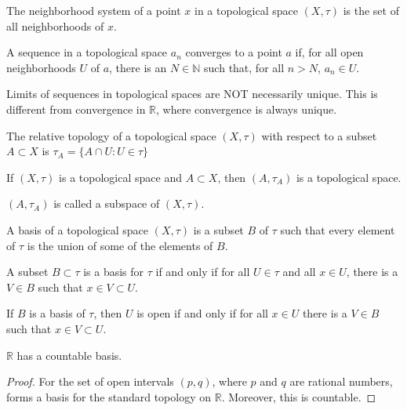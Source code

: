     \begin{definition}
        The neighborhood system of a point
        $x$ in a topological space $(X,\tau)$
        is the set of all neighborhoods of
        $x$.
    \end{definition}
    \begin{definition}
        A sequence in a topological space
        $a_{n}$ converges to a point $a$ if,
        for all open neighborhoods $U$ of $a$,
        there is an $N\in\mathbb{N}$ such that,
        for all $n>N$, $a_{n}\in{U}$.
    \end{definition}
    Limits of sequences in topological spaces are NOT
    necessarily unique. This is different from convergence
    in $\mathbb{R}$, where convergence is always unique.
    \begin{definition}
        The relative topology of a
        topological space $(X,\tau)$ with
        respect to a subset $A\subset{X}$
        is $\tau_{A}=\{A\cap{U}:U\in\tau\}$
    \end{definition}
    \begin{theorem}
        If $(X,\tau)$ is a topological space and
        $A\subset{X}$, then
        $(A,\tau_{A})$ is a topological space.
    \end{theorem}
    $(A,\tau_{A})$ is called a subspace of
    $(X,\tau)$.
    \begin{definition}
        A basis of a topological space
        $(X,\tau)$ is a subset $B$ of
        $\tau$ such that every element
        of $\tau$ is the union of some of the
        elements of $B$.
    \end{definition}
    \begin{theorem}
        A subset $B\subset\tau$ is a basis
        for $\tau$ if and only if for all
        $U\in\tau$ and all $x\in{U}$, there is
        a $V\in{B}$ such that
        $x\in{V}\subset{U}$.
    \end{theorem}
    \begin{theorem}
        If $B$ is a basis of $\tau$, then
        $U$ is open if and only if for all
        $x\in{U}$ there is a $V\in{B}$ such that
        $x\in{V}\subset{U}$.
    \end{theorem}
    \begin{theorem}
        $\mathbb{R}$ has a countable basis.
    \end{theorem}
    \begin{proof}
        For the set of open intervals
        $(p,q)$, where $p$ and $q$ are rational
        numbers, forms a basis for the standard
        topology on $\mathbb{R}$. Moreover, this
        is countable.
    \end{proof}
